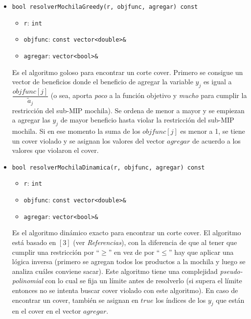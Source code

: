 \begin{itemize}
\item \verb_bool resolverMochilaGreedy(r, objfunc, agregar) const_
	\begin{itemize}
	\item \verb_r_: \verb_int_
	\item \verb_objfunc_: \verb_const vector<double>&_
	\item \verb_agregar_: \verb_vector<bool>&_
	\end{itemize}
Es el algoritmo goloso para encontrar un corte cover. Primero se consigue un vector de beneficios donde el beneficio de agregar la variable $y_j$ es igual a $\dfrac{objfunc[j]}{\tilde{a}_j}$ (o sea, aporta \emph{poco} a la función objetivo y \emph{mucho} para cumplir la restricción del sub-MIP mochila). Se ordena de menor a mayor y se empiezan a agregar las $y_j$ de mayor beneficio hasta violar la restricción del sub-MIP mochila. Si en ese momento la suma de los $objfunc[j]$ es menor a 1, se tiene un cover violado y se asignan los valores del vector $agregar$ de acuerdo a los valores que violaron el cover.

\item \verb_bool resolverMochilaDinamica(r, objfunc, agregar) const_
	\begin{itemize}
	\item \verb_r_: \verb_int_
	\item \verb_objfunc_: \verb_const vector<double>&_
	\item \verb_agregar_: \verb_vector<bool>&_
	\end{itemize}
Es el algoritmo dinámico exacto para encontrar un corte cover. El algoritmo está basado en $[3]$ (ver \emph{Referencias}), con la diferencia de que al tener que cumplir una restricción por ``$\geq$'' en vez de por ``$\leq$'' hay que aplicar una lógica inversa (primero se agregan todos los productos a la mochila y luego se analiza cuáles conviene sacar). Este algoritmo tiene una complejidad \emph{pseudo-polinomial} con lo cual se fija un límite antes de resolverlo (si supera el límite entonces no se intenta buscar cover violado con este algoritmo). En caso de encontrar un cover, también se asignan en $true$ los índices de los $y_j$ que están en el cover en el vector $agregar$.
\end{itemize}
